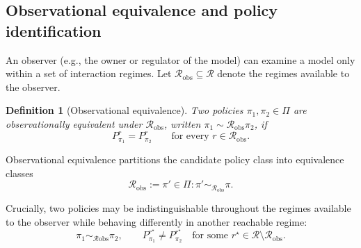 \documentclass{article}
\newtheorem{definition}{Definition}
\newcommand{\Rint}{\mathcal{R}}
\begin{document}
\subsection{Observational equivalence and policy identification}
\label{sec}

An observer (e.g., the owner or regulator of the model) can examine a model only within a set of interaction regimes. Let $\mathcal{R}_{\mathrm{obs}}\subseteq\Rint$ denote the regimes available to the observer.

\begin{definition}[Observational equivalence]
Two policies $\pi_1,\pi_2\in\Pi$ are \emph{observationally equivalent} under $\mathcal{R}_{\mathrm{obs}}$, written
$\pi_1\sim{\mathcal{R}_{\mathrm{obs}}}\pi_2$, if
\begin{equation}
P_{\pi_1}^{r}=P_{\pi_2}^{r}
\qquad
\text{for every } r\in\mathcal{R}_{\mathrm{obs}}.
\end{equation}
\end{definition}

Observational equivalence partitions the candidate policy class into equivalence classes
\begin{equation}
[\pi]{\mathcal{R}_{\mathrm{obs}}}
:=
{\pi'\in\Pi :
\pi'\sim_{\mathcal{R}_{\mathrm{obs}}}\pi}.
\end{equation}

Crucially, two policies may be indistinguishable throughout the regimes available to the observer while behaving differently in another reachable regime:
\begin{equation}
\pi_1\sim_{\mathcal{R}{\mathrm{obs}}}\pi_2,
\qquad
P_{\pi_1}^{r^\star}\neq P_{\pi_2}^{r^\star}
\quad
\text{for some } r^\star\in\Rint\setminus\mathcal{R}_{\mathrm{obs}}.
\end{equation}


\end{document}
